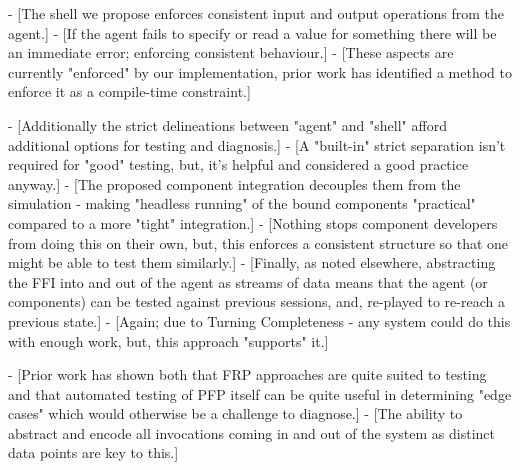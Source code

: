 - [The shell we propose enforces consistent input and output operations from the agent.]
    - [If the agent fails to specify or read a value for something there will be an immediate error; enforcing consistent behaviour.]
- [These aspects are currently "enforced" by our implementation, prior work has identified a method to enforce it as a compile-time constraint.\cite{winograd2012wormholes}]

- [Additionally the strict delineations between "agent" and "shell" afford additional options for testing and diagnosis.]
    - [A "built-in" strict separation isn't required for "good" testing, but, it's helpful and considered a good practice anyway.]
- [The proposed component integration decouples them from the simulation - making "headless running" of the bound components "practical" compared to a more "tight" integration.]
    - [Nothing stops component developers from doing this on their own, but, this enforces a consistent structure so that one might be able to test them similarly.]
- [Finally, as noted elsewhere, abstracting the FFI into and out of the agent as streams of data means that the agent (or components) can be tested against previous sessions, and, re-played to re-reach a previous state.]
    - [Again; due to Turning Completeness - any system could do this with enough work, but, this approach "supports" it.]

- [Prior work has shown both that FRP approaches are quite suited to testing\cite{perez2017testing} and that automated testing of PFP itself can be quite useful in determining "edge cases"\cite{claessen2011quickcheck} which would otherwise be a challenge to diagnose.]
    - [The ability to abstract and encode all invocations coming in and out of the system as distinct data points are key to this.]
